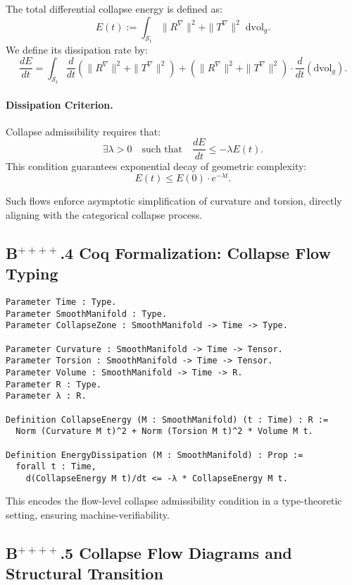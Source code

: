 \documentclass[11pt]{article}
\begin{document}
The total differential collapse energy is defined as:
\[
E(t) := \int_{\mathcal{S}_t} \| R^\nabla \|^2 + \| T^\nabla \|^2 \; \mathrm{dvol}_g.
\]
We define its dissipation rate by:
\[
\frac{dE}{dt} = \int_{\mathcal{S}_t} \frac{d}{dt} \left( \| R^\nabla \|^2 + \| T^\nabla \|^2 \right) + (\| R^\nabla \|^2 + \| T^\nabla \|^2) \cdot \frac{d}{dt}(\mathrm{dvol}_g).
\]

\paragraph{Dissipation Criterion.}
Collapse admissibility requires that:
\[
\exists \lambda > 0 \quad \text{such that} \quad \frac{dE}{dt} \leq -\lambda E(t).
\]
This condition guarantees exponential decay of geometric complexity:
\[
E(t) \leq E(0) \cdot e^{-\lambda t}.
\]

Such flows enforce asymptotic simplification of curvature and torsion, directly aligning with the categorical collapse process.

\subsection*{B$^{++++}$.4 Coq Formalization: Collapse Flow Typing}

\begin{lstlisting}[language=Coq, caption={Collapse Flow Formalization in Coq}]
Parameter Time : Type.
Parameter SmoothManifold : Type.
Parameter CollapseZone : SmoothManifold -> Time -> Type.

Parameter Curvature : SmoothManifold -> Time -> Tensor.
Parameter Torsion : SmoothManifold -> Time -> Tensor.
Parameter Volume : SmoothManifold -> Time -> R.
Parameter R : Type.
Parameter λ : R.

Definition CollapseEnergy (M : SmoothManifold) (t : Time) : R :=
  Norm (Curvature M t)^2 + Norm (Torsion M t)^2 * Volume M t.

Definition EnergyDissipation (M : SmoothManifold) : Prop :=
  forall t : Time,
    d(CollapseEnergy M t)/dt <= -λ * CollapseEnergy M t.
\end{lstlisting}

This encodes the flow-level collapse admissibility condition in a type-theoretic setting, ensuring machine-verifiability.

\subsection*{B$^{++++}$.5 Collapse Flow Diagrams and Structural Transition}
\end{document}
